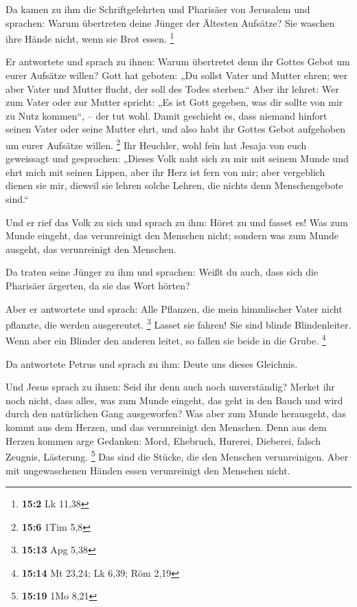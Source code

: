  Da kamen zu ihm die Schriftgelehrten und Pharisäer von
Jerusalem und sprachen:  Warum übertreten deine Jünger der
Ältesten Aufsätze? Sie waschen ihre Hände nicht, wenn sie Brot essen.
\footnote{\textbf{15:2} Lk 11,38}

 Er antwortete und sprach zu ihnen: Warum übertretet denn
ihr Gottes Gebot um eurer Aufsätze willen?  Gott hat
geboten: „Du sollst Vater und Mutter ehren; wer aber Vater und Mutter
flucht, der soll des Todes sterben.``  Aber ihr lehret:
Wer zum Vater oder zur Mutter spricht: „Es ist Gott gegeben, was dir
sollte von mir zu Nutz kommen``, -- der tut wohl.  Damit
geschieht es, dass niemand hinfort seinen Vater oder seine Mutter ehrt,
und also habt ihr Gottes Gebot aufgehoben um eurer Aufsätze willen.
\footnote{\textbf{15:6} 1Tim 5,8}  Ihr Heuchler, wohl fein
hat Jesaja von euch geweissagt und gesprochen:  „Dieses
Volk naht sich zu mir mit seinem Munde und ehrt mich mit seinen Lippen,
aber ihr Herz ist fern von mir;  aber vergeblich dienen
sie mir, dieweil sie lehren solche Lehren, die nichts denn
Menschengebote sind.``

 Und er rief das Volk zu sich und sprach zu ihm: Höret zu
und fasset es!  Was zum Munde eingeht, das verunreinigt
den Menschen nicht; sondern was zum Munde ausgeht, das verunreinigt den
Menschen.

 Da traten seine Jünger zu ihm und sprachen: Weißt du
auch, dass sich die Pharisäer ärgerten, da sie das Wort hörten?

 Aber er antwortete und sprach: Alle Pflanzen, die mein
himmlischer Vater nicht pflanzte, die werden ausgereutet. \footnote{\textbf{15:13}
  Apg 5,38}  Lasset sie fahren! Sie sind blinde
Blindenleiter. Wenn aber ein Blinder den anderen leitet, so fallen sie
beide in die Grube. \footnote{\textbf{15:14} Mt 23,24; Lk 6,39; Röm 2,19}

 Da antwortete Petrus und sprach zu ihm: Deute uns dieses
Gleichnis.

 Und Jesus sprach zu ihnen: Seid ihr denn auch noch
unverständig?  Merket ihr noch nicht, dass alles, was zum
Munde eingeht, das geht in den Bauch und wird durch den natürlichen Gang
ausgeworfen?  Was aber zum Munde herausgeht, das kommt
aus dem Herzen, und das verunreinigt den Menschen.  Denn
aus dem Herzen kommen arge Gedanken: Mord, Ehebruch, Hurerei, Dieberei,
falsch Zeugnis, Lästerung. \footnote{\textbf{15:19} 1Mo 8,21}
 Das sind die Stücke, die den Menschen verunreinigen.
Aber mit ungewaschenen Händen essen verunreinigt den Menschen nicht.

